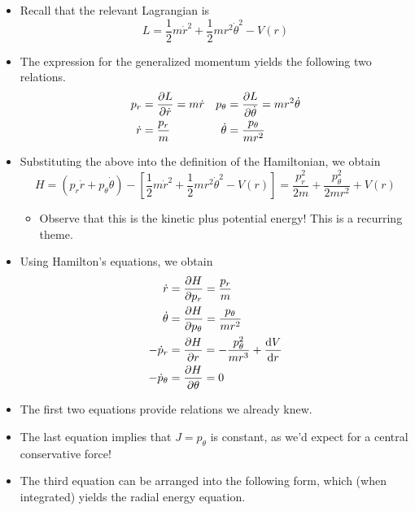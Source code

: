 \documentclass[../notes.tex]{subfiles}
\begin{document}
\begin{itemize}
\begin{itemize}
        \item Recall that the relevant Lagrangian is
        \begin{equation*}
            L = \frac{1}{2}m\dot{r}^2+\frac{1}{2}mr^2\dot{\theta}^2-V(r)
        \end{equation*}
        \item The expression for the generalized momentum yields the following two relations.
        \begin{align*}
            p_r &= \pdv{L}{\dot{r}} = m\dot{r}&
                p_\theta &= \pdv{L}{\dot{\theta}} = mr^2\dot{\theta}\\
            \dot{r} &= \frac{p_r}{m}&
                \dot{\theta} &= \frac{p_\theta}{mr^2}
        \end{align*}
        \item Substituting the above into the definition of the Hamiltonian, we obtain
        \begin{equation*}
            H = (p_r\dot{r}+p_\theta\dot{\theta})-\left[ \frac{1}{2}m\dot{r}^2+\frac{1}{2}mr^2\dot{\theta}^2-V(r) \right]
            = \frac{p_r^2}{2m}+\frac{p_\theta^2}{2mr^2}+V(r)
        \end{equation*}
        \begin{itemize}
            \item Observe that this is the kinetic plus potential energy! This is a recurring theme.
        \end{itemize}
        \item Using Hamilton's equations, we obtain
        \begin{align*}
            \dot{r} &= \pdv{H}{p_r} = \frac{p_r}{m}\\
            \dot{\theta} &= \pdv{H}{p_\theta} = \frac{p_\theta}{mr^2}\\
            -\dot{p}_r &= \pdv{H}{r} = -\frac{p_\theta^2}{mr^3}+\dv{V}{r}\\
            -\dot{p}_\theta &= \pdv{H}{\theta} = 0
        \end{align*}
        \item The first two equations provide relations we already knew.
        \item The last equation implies that $J=p_\theta$ is constant, as we'd expect for a central conservative force!
        \item The third equation can be arranged into the following form, which (when integrated) yields the radial energy equation.
        \begin{equation*}

\end{equation*}
\end{itemize}
\end{itemize}
\end{document}
